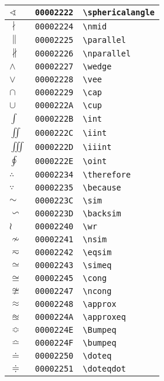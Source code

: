 \begin{longtable}{|l|l|l|}
\hline
$\sphericalangle$ & \texttt{00002222} & \verb|\sphericalangle| \\
\hline
$\nmid$ & \texttt{00002224} & \verb|\nmid| \\
\hline
$\parallel$ & \texttt{00002225} & \verb|\parallel| \\
\hline
$\nparallel$ & \texttt{00002226} & \verb|\nparallel| \\
\hline
$\wedge$ & \texttt{00002227} & \verb|\wedge| \\
\hline
$\vee$ & \texttt{00002228} & \verb|\vee| \\
\hline
$\cap$ & \texttt{00002229} & \verb|\cap| \\
\hline
$\cup$ & \texttt{0000222A} & \verb|\cup| \\
\hline
$\int$ & \texttt{0000222B} & \verb|\int| \\
\hline
$\iint$ & \texttt{0000222C} & \verb|\iint| \\
\hline
$\iiint$ & \texttt{0000222D} & \verb|\iiint| \\
\hline
$\oint$ & \texttt{0000222E} & \verb|\oint| \\
\hline
$\therefore$ & \texttt{00002234} & \verb|\therefore| \\
\hline
$\because$ & \texttt{00002235} & \verb|\because| \\
\hline
$\sim$ & \texttt{0000223C} & \verb|\sim| \\
\hline
$\backsim$ & \texttt{0000223D} & \verb|\backsim| \\
\hline
$\wr$ & \texttt{00002240} & \verb|\wr| \\
\hline
$\nsim$ & \texttt{00002241} & \verb|\nsim| \\
\hline
$\eqsim$ & \texttt{00002242} & \verb|\eqsim| \\
\hline
$\simeq$ & \texttt{00002243} & \verb|\simeq| \\
\hline
$\cong$ & \texttt{00002245} & \verb|\cong| \\
\hline
$\ncong$ & \texttt{00002247} & \verb|\ncong| \\
\hline
$\approx$ & \texttt{00002248} & \verb|\approx| \\
\hline
$\approxeq$ & \texttt{0000224A} & \verb|\approxeq| \\
\hline
$\Bumpeq$ & \texttt{0000224E} & \verb|\Bumpeq| \\
\hline
$\bumpeq$ & \texttt{0000224F} & \verb|\bumpeq| \\
\hline
$\doteq$ & \texttt{00002250} & \verb|\doteq| \\
\hline
$\doteqdot$ & \texttt{00002251} & \verb|\doteqdot| \\

\end{longtable}
